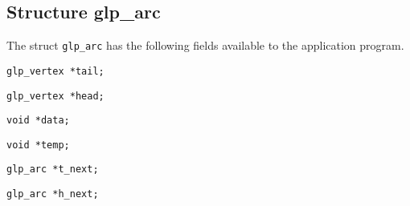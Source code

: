 \documentclass[11pt]{report}
\def\para#1{\noindent{\bf#1}}
\begin{document}
\subsection{Structure glp\_arc}

The struct \verb|glp_arc| has the following fields available to the
application program.

\noindent
\verb|glp_vertex *tail;|

\begin{comment}Pointer to a vertex, which is tail endpoint of the arc.
\end{comment}

\newpage

\noindent
\verb|glp_vertex *head;|

\begin{comment}Pointer to a vertex, which is head endpoint of the arc.
\end{comment}


\noindent
\verb|void *data;|

\begin{comment}Pointer to a data block associated with the arc. This
data block is automatically allocated on creating a new arc and freed on
deleting the arc. If $v\_size=0$, the block is not allocated, and this
field contains \verb|NULL|.
\end{comment}

\noindent
\verb|void *temp;|

\begin{comment}Working pointer, which may be used freely for any
purposes. The application program can change this field directly.
\end{comment}

\noindent
\verb|glp_arc *t_next;|

\begin{comment}Pointer to another arc, which has the same tail endpoint
as this one. \verb|NULL| in this field indicates the end of the list of
outgoing arcs.
\end{comment}

\noindent
\verb|glp_arc *h_next;|

\begin{comment}Pointer to another arc, which has the same head endpoint
as this one. \verb|NULL| in this field indicates the end of the list of
incoming arcs.
\end{comment}

\end{document}
